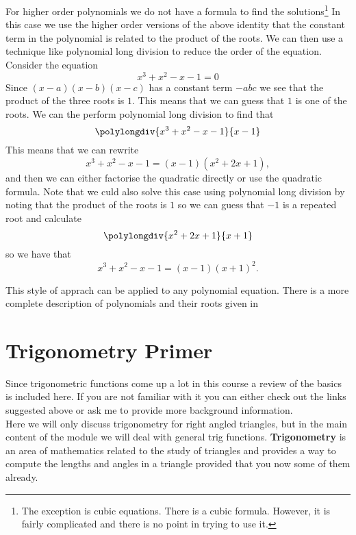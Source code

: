For higher order polynomials we do not have a formula to find the solutions\footnote{The exception is cubic equations. There is a cubic formula. However, it is fairly complicated and there is no point in trying to use it.} In this case we use the higher order versions of the above identity that the constant term in the polynomial is related to the product of the roots. We can then use a technique like polynomial long division to reduce the order of the equation.\\

Consider the equation
\begin{equation*}
x^{3}+x^{2}-x-1=0
\end{equation*}
Since $(x-a)(x-b)(x-c)$ has a constant term $-abc$ we see that the product of the three roots is $1$. This means that we can guess that $1$ is one of the roots. We can the perform polynomial long division to find that
\begin{equation*}
\polylongdiv{x^3+x^2-x-1}{x-1}
\end{equation*}
This means that we can rewrite
\begin{equation*}
x^{3}+x^{2}-x-1=(x-1)(x^{2}+2x+1),
\end{equation*}
and then we can either factorise the quadratic directly or use the quadratic formula. Note that we culd also solve this case using polynomial long division by noting that the product of the roots is $1$ so we can guess that $-1$ is a repeated root and calculate
\begin{equation*}
\polylongdiv{x^{2}+2x+1}{x+1}
\end{equation*}
so we have that
\begin{equation*}
x^{3}+x^{2}-x-1=(x-1)(x+1)^{2}.
\end{equation*}

This style of apprach can be applied to any polynomial equation. There is a more complete description of polynomials and their roots given in \cite{algI}

\section{Trigonometry Primer}
Since trigonometric functions come up a lot in this course a review of the basics is included here. If you are not familiar with it you can either check out the links suggested above or ask me to provide more background information.\\

Here we will only discuss trigonometry for right angled triangles, but in the main content of the module we will deal with general trig functions. \textbf{Trigonometry} is an area of mathematics related to the study of triangles and provides a way to compute the lengths and angles in a triangle provided that you now some of them already.

